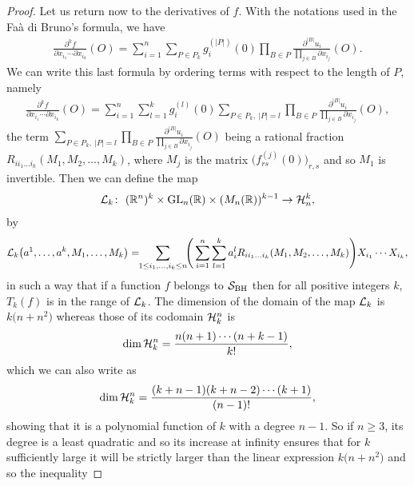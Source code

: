 \documentclass[pdftex]{sigma}%
\numberwithin{equation}{section}
\begin{document}
\begin{proof}
	Let us return now to the derivatives of $f$. With the notations used in the Fa\`a di Bruno's formula, we have
\begin{gather*}
\frac{\partial^kf}{\partial x_{i_1}\cdots\partial{x_{i_k}}}(O)=\sum_{i=1}^n\sum_{P\in P_k}g_i^{(\vert P\vert)}(0)\prod_{B\in P}\frac{\partial^{\vert B\vert} u_i}{\prod_{j\in B}{\partial x_{i_j}}}(O).
\end{gather*}
	We can write this last formula by ordering terms with respect to the length of $P$, namely
\begin{gather*}
\frac{\partial^kf}{\partial x_{i_1}\cdots\partial{x_{i_k}}}(O)=\sum_{i=1}^n\sum_{l=1}^kg_i^{(l)}(0)\sum_{P\in P_k,\ \vert P\vert=l}\prod_{B\in P}\frac{\partial^{\vert B\vert} u_i}{\prod_{j\in B}{\partial x_{i_j}}}(O),
\end{gather*}
	the term $\sum_{P\in P_k,\ \vert P\vert=l}\prod_{B\in P}\frac{\partial^{\vert B\vert} u_i}{\prod_{j\in B}{\partial x_{i_j}}}(O)$ being a rational fraction $R_{ii_1\dots i_k}(M_1,M_2,\dots,M_k)$, where $M_j$ is the matrix $\big(f^{(j)}_{rs}(0)\big)_{r,s}$ and so $M_1$ is invertible.
	Then we can define the map
\begin{gather*}
{\cal L}_k\colon\ (\mathbb{R}^n)^k\times {\rm GL}_n(\mathbb{R})\times(M_n(\mathbb{R}))^{k-1}\to{\cal H}_n^k,
\end{gather*}
by
\begin{gather*}
{\cal L}_k\big(a^1,\dots,a^k,M_1,\dots,M_k\big)=\!\!\sum_{1\leq i_1,\dots,i_k\leq n}\!\!\Bigg(\sum_{i=1}^n\sum_{l=1}^ka_i^lR_{ii_1\dots i_k}(M_1,M_2,\dots,M_k)\Bigg)X_{i_1}\cdots X_{i_k},
\end{gather*}
in such a way that if a function $f$ belongs to ${\cal S}_{\rm BH}$ then for all positive integers $k$, $T_k(f)$ is in the range of ${\cal L}_k$.
	The dimension of the domain of the map ${\cal L}_k$ is $k\big(n+n^2\big)$ whereas those of its codomain ${\cal H}_k^n$ is
\begin{gather*}
\operatorname{dim}{\cal H}_k^n=\frac{n(n+1)\cdots(n+k-1)}{k!},
\end{gather*}
	which we can also write as
\begin{gather*}
\operatorname{dim}{\cal H}_k^n=\frac{(k+n-1)(k+n-2)\cdots (k+1)}{(n-1)!},
\end{gather*}
	showing that it is a polynomial function of $k$ with a degree $n-1$. So if $n\geq 3$, its degree is a least quadratic and so its increase at infinity ensures that for $k$ sufficiently large it will be strictly larger than the linear expression $k\big(n+n^2\big)$ and so the inequality

\end{proof}
\end{document}
